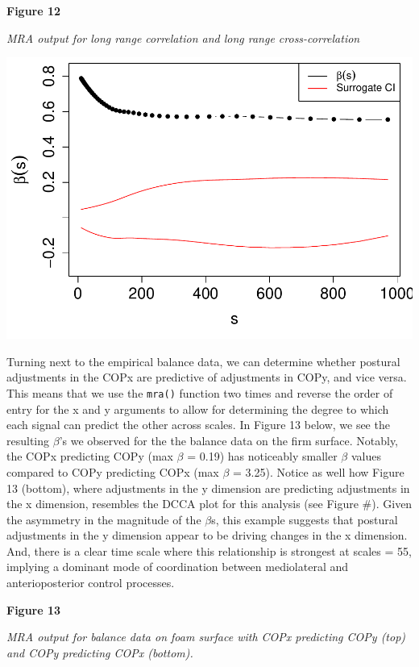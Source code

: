 \documentclass[
  man]{apa6}
\begin{document}
\textbf{Figure 12}

\emph{MRA output for long range correlation and long range cross-correlation}

\includegraphics{fractal_regression_paper_brm_files/figure-latex/unnamed-chunk-24-1.pdf}

Turning next to the empirical balance data, we can determine whether
postural adjustments in the COPx are predictive of adjustments in COPy,
and vice versa. This means that we use the \texttt{mra()} function two times
and reverse the order of entry for the x and y arguments to allow for
determining the degree to which each signal can predict the other across
scales. In Figure 13 below, we see the resulting \(\beta\)'s we observed
for the the balance data on the firm surface. Notably, the COPx
predicting COPy (max \(\beta\) = 0.19) has
noticeably smaller \(\beta\) values compared to COPy predicting COPx (max
\(\beta\) = 3.25). Notice as well how Figure 13
(bottom), where adjustments in the y dimension are predicting
adjustments in the x dimension, resembles the DCCA plot for this
analysis (see Figure \#). Given the asymmetry in the magnitude of the
\(\beta\)s, this example suggests that postural adjustments in the y
dimension appear to be driving changes in the x dimension. And, there is
a clear time scale where this relationship is strongest at scales =
55, implying a
dominant mode of coordination between mediolateral and anterioposterior
control processes.

\textbf{Figure 13}

\emph{MRA output for balance data on foam surface with COPx predicting COPy
(top) and COPy predicting COPx (bottom).}
\end{document}
